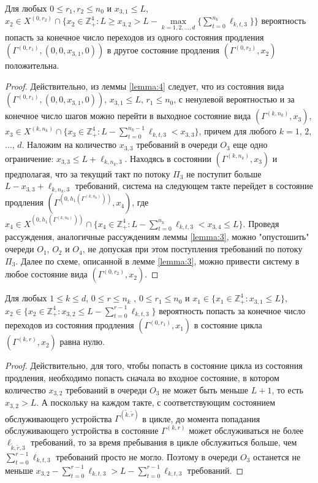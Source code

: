 \documentclass[a4paper,12pt,russian]{extarticle}
\newcommand{\ga}[1]{\Gamma^{\left( #1 \right)} }
\begin{document}
\begin{lemma}
Для любых $0 \leqslant r_1, r_2 \leqslant n_0$ и $x_{3,1}\leqslant L$, $x_2 \in X^{(0,r_2)}\cap \{x_2 \in \mathbb{Z}_+^4 \colon L \geqslant x_{3,2} > L - \max\limits_{k=1, 2, \ldots, d}\{\sum_{t=0}^{n_k} \ell_{k,t,3}\}\}$ вероятность попасть за конечное число переходов из одного состояния продления $(\ga{0,r_1},(0,0,x_{3,1},0))$ в другое состояние продления $(\ga{0,r_2},x_2)$ положительна.
\label{lemma:6}
\end{lemma}
\begin{proof}
Действительно, из леммы \eqref{lemma:4} следует, что из состояния вида $(\ga{0,r_1},(0,0,x_{3,1},0))$, $x_{3,1}\leqslant L$, $r_1 \leqslant n_0$, с ненулевой вероятностью и за конечное число шагов можно перейти в выходное состояние вида $(\ga{k,n_k},x_3)$, $x_3 \in X^{(k,n_k)}\cap \{x_3 \in \mathbb{Z}_+^4 \colon   L - \sum_{t=0}^{n_k-1} \ell_{k,t,3} < x_{3,3}\}$, причем для любого $k=1$, $2$, $\ldots$, $d$. Наложим на количество $x_{3,3}$ требований в очереди $O_3$ еще одно ограничение: $x_{3,3} \leqslant L + \ell_{k,n_k,3}$. Находясь в состоянии $(\ga{k,n_k},x_3)$ и предполагая, что за текущий такт по потоку $\Pi_3$ не поступит больше $L - x_{3,3} + \ell_{k,n_k,3}$ требований, система на следующем такте перейдет в состояние продления $(\ga{0,h_1(\ga{k,n_k})}, x_4)$, где $x_4 \in X^{(0,h_1(\ga{k,n_k}))}\cap \{x_4 \in \mathbb{Z}_+^4 \colon  L - \sum_{t=0}^{n_k} \ell_{k,t,3} < x_{3,4} \leqslant L\}$. Проведя рассуждения, аналогичные рассуждениям леммы \ref{lemma:3}, можно "опустошить" очереди $O_1$, $O_2$ и $O_4$, не допуская при этом поступления требований по потоку $\Pi_3$. Далее по схеме, описанной в лемме \ref{lemma:3}, можно привести систему в любое состояние вида $(\ga{0,r_2}, x_2)$.
\end{proof}


\begin{lemma}
Для любых $1 \leqslant k \leqslant d$, $0 \leqslant r \leqslant n_k$ , $0 \leqslant r_1 \leqslant n_0$ и $x_1 \in \{x_1 \in \mathbb{Z}_+^4 \colon x_{3,1}\leqslant L\}$, $x_2 \in \{x_2 \in \mathbb{Z}_+^4 \colon x_{3,2} \leqslant L -\sum_{t=0}^{r-1} \ell_{k,t,3}\}$ вероятность попасть за конечное число переходов из состояния продления $(\ga{0,r_1},x_1)$ в состояние цикла $(\ga{k,r},x_2)$ равна нулю.
\label{lemma:7}
\end{lemma}
\begin{proof}
Действительно, для того, чтобы попасть в состояние цикла из состояния продления, необходимо попасть сначала во входное состояние, в котором количество $x_{3,2}$ требований в очереди $O_3$ не может быть меньше $L+1$, то есть $x_{3,2} > L$. А поскольку на каждом такте, с соответствующим состоянием обслуживающего устройства $\ga{\tilde{k},\tilde{r}}$ в цикле, до момента попадания обслуживающего устройства в состояние $\ga{k,r}$ может обслуживаться не более $\ell_{\tilde{k},\tilde{r}, 3}$ требований, то за время пребывания в цикле обслужиться больше, чем $\sum_{t=0}^{r-1} \ell_{k,t,3}$ требований просто не могло. Поэтому в очереди $O_3$ останется не меньше $x_{3,2} -\sum_{t=0}^{r-1} \ell_{k,t,3}> L - \sum_{t=0}^{r-1} \ell_{k,t,3}$ требований.
\end{proof}
\end{document}
